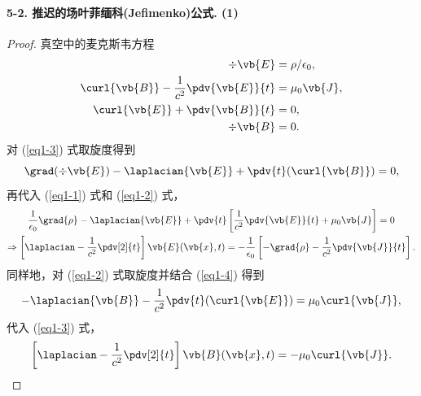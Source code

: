 \documentclass[12pt]{article}
\begin{document}
\maketitle

\paragraph{5-2. 推迟的场叶菲缅科(Jefimenko)公式. (1)}
\begin{proof}
  真空中的麦克斯韦方程
  \begin{align}
    \div{\vb{E}} &= \rho / \epsilon_0, \label{eq1-1}\\
    \curl{\vb{B}} - \frac{1}{c^2} \pdv{\vb{E}}{t} &= \mu_0 \vb{J}, \label{eq1-2}\\
    \curl{\vb{E}} + \pdv{\vb{B}}{t} &= 0, \label{eq1-3}\\
    \div{\vb{B}} &= 0. \label{eq1-4}
  \end{align}
  对 (\ref{eq1-3}) 式取旋度得到
  \begin{equation*}
    \grad(\div{\vb{E}}) - \laplacian{\vb{E}} + \pdv{t}(\curl{\vb{B}}) = 0,
  \end{equation*}
  再代入 (\ref{eq1-1}) 式和 (\ref{eq1-2}) 式，
  \begin{gather}
    \frac{1}{\epsilon_0} \grad{\rho} - \laplacian{\vb{E}} + \pdv{t} \left[\frac{1}{c^2} \pdv{\vb{E}}{t} + \mu_0 \vb{J}\right] = 0 \notag\\
    \Rightarrow \left[\laplacian - \frac{1}{c^2} \pdv[2]{t}\right] \vb{E}(\vb{x}, t) = -\frac{1}{\epsilon_0} \left[-\grad{\rho} - \frac{1}{c^2} \pdv{\vb{J}}{t}\right].
  \end{gather}
  同样地，对 (\ref{eq1-2}) 式取旋度并结合 (\ref{eq1-4}) 得到
  \begin{equation*}
    -\laplacian{\vb{B}} - \frac{1}{c^2} \pdv{t}(\curl{\vb{E}}) = \mu_0 \curl{\vb{J}},
  \end{equation*}
  代入 (\ref{eq1-3}) 式，
  \begin{equation}
    \left[\laplacian - \frac{1}{c^2} \pdv[2]{t}\right] \vb{B}(\vb{x}, t) = -\mu_0 \curl{\vb{J}}.
  \end{equation}
\end{proof}
\end{document}
